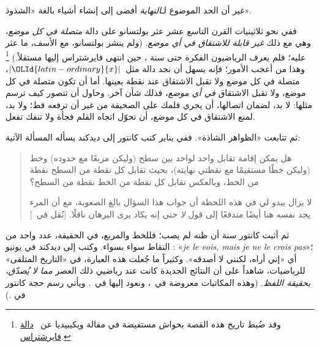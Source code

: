 \documentclass[../../../include/open-logic-section]{subfiles}
\begin{document}

غير أن الحد الموضوع لـ\emph{النهاية} أفضى إلى إنشاء أشياء بالغة «الشذوذ».

ففي نحو ثلاثينيات القرن التاسع عشر عثر بولتسانو على دالة \emph{متصلة في
كل موضع}، وهي مع ذلك \emph{غير قابلة للاشتقاق في أي موضع}. (ولم ينشر
بولتسانو، مع الأسف، ما عثر عليه؛ فلم يعرف الرياضيون الفكرة حتى سنة ،
حين انتهى فايرشتراس إليها مستقلاً.) \footnote{وقد ضُبط تاريخ هذه القصة
بحواش مستفيضة في مقالة ويكيبيديا عن
~\href{http://en.wikipedia.org/wiki/Weierstrass_function}{دالة
فايرشتراس}.} وهذا من أعجب الأمور؛ فإنه يسهل أن نجد دالة مثل~$|{\OLId{latin-ordinary}{x}}|$، متصلة
في كل موضع ولا تقبل الاشتقاق عند نقطة بعينها. أما أن تكون متصلة في كل
موضع، ولا تقبل الاشتقاق \emph{في أي موضع}، فذلك شأن آخر. وحاول أن تتصور
كيف ترسم مثلها: لا بد، لضمان اتصالها، أن يجري قلمك على الصحيفة من غير أن
ترفعه قط؛ ولا بد، لمنع الاشتقاق في كل موضع، أن تحوّل اتجاه القلم فجأة ولا
تنفك تفعل.

ثم تتابعت «الظواهر الشاذة». ففي  يناير  كتب كانتور إلى ديدكند يسأله
المسألة الآتية:
\begin{quote}
هل يمكن إقامة تقابل واحد لواحد بين سطح (وليكن مربعًا مع حدوده) وخط
(وليكن خطًا مستقيمًا مع نقطتي نهايته)، بحيث تقابل كل نقطة من السطح
نقطة من الخط، وبالعكس تقابل كل نقطة من الخط نقطة من السطح؟

لا يزال يبدو لي في هذه اللحظة أن جواب هذا السؤال بالغ الصعوبة، مع أن
المرء يجد نفسه هنا أيضًا مندفعًا إلى قول \emph{لا} حتى إنه يكاد يرى
البرهان نافلًا.
[نُقل في~\citealt{Gouvea2011}]
\end{quote}
ثم أثبت كانتور سنة  أن ظنه لم يصب؛ فللخط والمربع، في الحقيقة، عدد
واحد من النقاط سواء بسواء. وكتب إلى ديدكند في  يونيو :
«\emph{je le vois, mais je ne le crois pas}»؛ أي «إني أراه، لكنني لا
أصدقه». وكثيراً ما جُعلت هذه العبارة، في «التاريخ المتلقى» للرياضيات،
شاهداً على أن النتائج الجديدة كانت عند رياضيي ذلك العصر \emph{مما لا
يُصدّق، بحقيقة اللفظ}. (وهذه المكاتبات معروضة في~\citet{Gouvea2011}،
ونعود إليها في~. ويأتي رسم حجة كانتور في
.)
\end{document}
